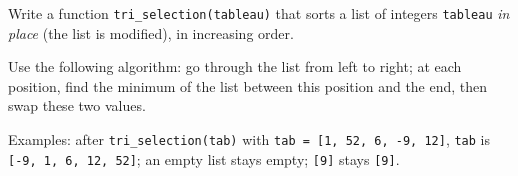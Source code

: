Write a function \texttt{tri\_selection(tableau)} that sorts a list of integers \texttt{tableau} \emph{in place} (the list is modified), in increasing order.

Use the following algorithm: go through the list from left to right; at each position, find the minimum of the list between this position and the end, then swap these two values.

Examples: after \texttt{tri\_selection(tab)} with \texttt{tab = [1, 52, 6, -9, 12]}, \texttt{tab} is \texttt{[-9, 1, 6, 12, 52]}; an empty list stays empty; \texttt{[9]} stays \texttt{[9]}.
